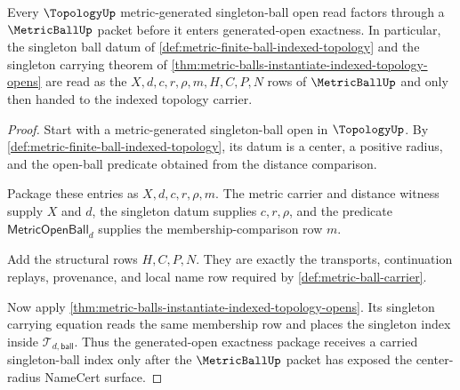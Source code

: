 \begin{theorem}
\label{thm:metric-ball-topology-handoff}
Every $\TopologyUp$ metric-generated singleton-ball open read factors through a $\MetricBallUp$ packet before it enters generated-open exactness. In particular, the singleton ball datum of \autoref{def:metric-finite-ball-indexed-topology} and the singleton carrying theorem of \autoref{thm:metric-balls-instantiate-indexed-topology-opens} are read as the $X,d,c,r,\rho,m,H,C,P,N$ rows of $\MetricBallUp$ and only then handed to the indexed topology carrier.
\end{theorem}
\begin{proof}
Start with a metric-generated singleton-ball open in $\TopologyUp$. By \autoref{def:metric-finite-ball-indexed-topology}, its datum is a center, a positive radius, and the open-ball predicate obtained from the distance comparison.

Package these entries as $X,d,c,r,\rho,m$. The metric carrier and distance witness supply $X$ and $d$, the singleton datum supplies $c,r,\rho$, and the predicate $\mathsf{MetricOpenBall}_d$ supplies the membership-comparison row $m$.

Add the structural rows $H,C,P,N$. They are exactly the transports, continuation replays, provenance, and local name row required by \autoref{def:metric-ball-carrier}.

Now apply \autoref{thm:metric-balls-instantiate-indexed-topology-opens}. Its singleton carrying equation reads the same membership row and places the singleton index inside $\mathcal{T}_{d,\mathsf{ball}}$. Thus the generated-open exactness package receives a carried singleton-ball index only after the $\MetricBallUp$ packet has exposed the center-radius NameCert surface.
\end{proof}

